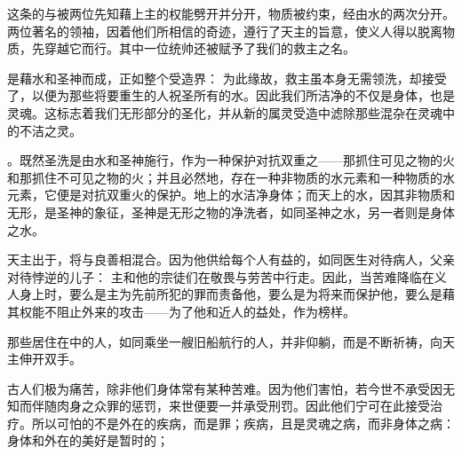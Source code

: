 这条的与被两位先知藉上主的权能劈开并分开，物质被约束，经由水的两次分开。两位著名的领袖，因着他们所相信的奇迹，遵行了天主的旨意，使义人得以脱离物质，先穿越它而行。其中一位统帅还被赋予了我们的救主之名。\par

是藉水和圣神而成，正如整个受造界：  为此缘故，救主虽本身无需领洗，却接受了，以便为那些将要重生的人祝圣所有的水。因此我们所洁净的不仅是身体，也是灵魂。这标志着我们无形部分的圣化，并从新的属灵受造中滤除那些混杂在灵魂中的不洁之灵。\par

。既然圣洗是由水和圣神施行，作为一种保护对抗双重之——那抓住可见之物的火和那抓住不可见之物的火；并且必然地，存在一种非物质的水元素和一种物质的水元素，它便是对抗双重火的保护。地上的水洁净身体；而天上的水，因其非物质和无形，是圣神的象征，圣神是无形之物的净洗者，如同圣神之水，另一者则是身体之水。\par

天主出于，将与良善相混合。因为他供给每个人有益的，如同医生对待病人，父亲对待悖逆的儿子：  主和他的宗徒们在敬畏与劳苦中行走。因此，当苦难降临在义人身上时，要么是主为先前所犯的罪而责备他，要么是为将来而保护他，要么是藉其权能不阻止外来的攻击——为了他和近人的益处，作为榜样。\par

那些居住在中的人，如同乘坐一艘旧船航行的人，并非仰躺，而是不断祈祷，向天主伸开双手。\par

古人们极为痛苦，除非他们身体常有某种苦难。因为他们害怕，若今世不承受因无知而伴随肉身之众罪的惩罚，来世便要一并承受刑罚。因此他们宁可在此接受治疗。所以可怕的不是外在的疾病，而是罪；疾病，且是灵魂之病，而非身体之病：  身体和外在的美好是暂时的； \par

